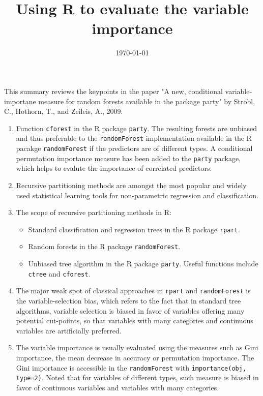 \documentclass[14pt]{article}
\begin{document}
\title{Using R to evaluate the variable importance}
\date{\today}
\maketitle

This summary reviews the keypoints in the paper "A new, conditional variable-importane measure for random forests available in the package party" by Strobl, C., Hothorn, T., and Zeileis, A., 2009.

\begin{enumerate}
 \item Function \texttt{cforest} in the R package \texttt{party}. The resulting forests are unbiased and thus preferable to the \texttt{randomForest} implementation available in the R pacakge \texttt{randomForest} if the predictors are of different types. A conditional permutation importance measure has been added to the \texttt{party} package, which helps to evalute the importance of correlated predictors. 
 
 \item Recursive partitioning methods are amongst the most popular and widely used statistical learning tools for non-parametric regression and classification.
 
 \item The scope of recursive partitioning methods in R:
  \begin{itemize}
   \item Standard classification and regression trees in the R package \texttt{rpart}.
   \item Random forests in the R package \texttt{randomForest}.
   \item Unbiased tree algorithm in the R package \texttt{party}. Useful functions include \texttt{ctree} and \texttt{cforest}.
  \end{itemize}

 \item The major weak spot of classical approaches in \texttt{rpart} and \texttt{randomForest} is the variable-selection bias, which refers to the fact that in standard tree algorithms, variable selection is biased in favor of variables offering many potential cut-poiints, so that variables with many categories and continuous variables are artificially preferred.
 
 \item The variable importance is usually evaluated using the measures such as Gini importance, the mean decrease in accuracy or permutation importance. The Gini importance is accessible in the \texttt{randomForest} with \texttt{importance(obj, type=2)}. Noted that for variables of different types, such measure is biased in favor of continuous variables and variables with many categories.
 

\end{enumerate}
\end{document}
